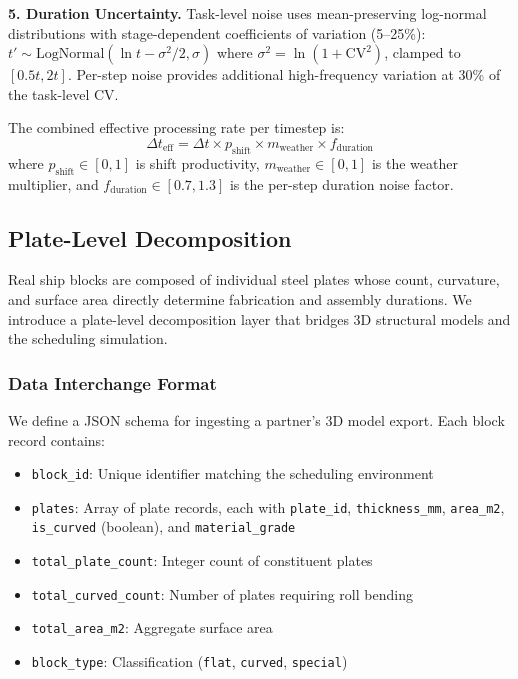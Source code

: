 \documentclass[11pt,a4paper]{article}
\begin{document}
\textbf{5. Duration Uncertainty.} Task-level noise uses mean-preserving log-normal distributions with stage-dependent coefficients of variation (5--25\%): $t' \sim \text{LogNormal}(\ln t - \sigma^2/2, \sigma)$ where $\sigma^2 = \ln(1 + \text{CV}^2)$, clamped to $[0.5t, 2t]$. Per-step noise provides additional high-frequency variation at 30\% of the task-level CV.

The combined effective processing rate per timestep is:
\begin{equation}
\Delta t_{\text{eff}} = \Delta t \times p_{\text{shift}} \times m_{\text{weather}} \times f_{\text{duration}}
\end{equation}
where $p_{\text{shift}} \in [0, 1]$ is shift productivity, $m_{\text{weather}} \in [0, 1]$ is the weather multiplier, and $f_{\text{duration}} \in [0.7, 1.3]$ is the per-step duration noise factor.

\subsection{Plate-Level Decomposition}
\label{sec:plate_decomposition}

Real ship blocks are composed of individual steel plates whose count, curvature, and surface area directly determine fabrication and assembly durations. We introduce a plate-level decomposition layer that bridges 3D structural models and the scheduling simulation.

\subsubsection{Data Interchange Format}

We define a JSON schema for ingesting a partner's 3D model export. Each block record contains:
\begin{itemize}
    \item \texttt{block\_id}: Unique identifier matching the scheduling environment
    \item \texttt{plates}: Array of plate records, each with \texttt{plate\_id}, \texttt{thickness\_mm}, \texttt{area\_m2}, \texttt{is\_curved} (boolean), and \texttt{material\_grade}
    \item \texttt{total\_plate\_count}: Integer count of constituent plates
    \item \texttt{total\_curved\_count}: Number of plates requiring roll bending
    \item \texttt{total\_area\_m2}: Aggregate surface area
    \item \texttt{block\_type}: Classification (\texttt{flat}, \texttt{curved}, \texttt{special})
\end{itemize}
\end{document}
